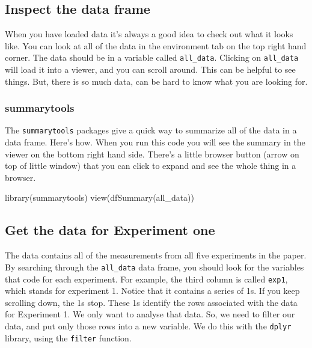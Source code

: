 \documentclass[
]{book}
\newenvironment{Shaded}{\begin{snugshade}}{\end{snugshade}}
\newcommand{\FunctionTok}[1]{\textcolor[rgb]{0.00,0.00,0.00}{#1}}
\newcommand{\NormalTok}[1]{#1}
\begin{document}
\hypertarget{inspect-the-data-frame}{%
\subsection{Inspect the data frame}\label{inspect-the-data-frame}}

When you have loaded data it's always a good idea to check out what it looks like. You can look at all of the data in the environment tab on the top right hand corner. The data should be in a variable called \texttt{all\_data}. Clicking on \texttt{all\_data} will load it into a viewer, and you can scroll around. This can be helpful to see things. But, there is so much data, can be hard to know what you are looking for.

\hypertarget{summarytools-1}{%
\subsubsection{summarytools}\label{summarytools-1}}

The \texttt{summarytools} packages give a quick way to summarize all of the data in a data frame. Here's how. When you run this code you will see the summary in the viewer on the bottom right hand side. There's a little browser button (arrow on top of little window) that you can click to expand and see the whole thing in a browser.

\begin{Shaded}
\begin{Highlighting}[]
\FunctionTok{library}\NormalTok{(summarytools)}
\FunctionTok{view}\NormalTok{(}\FunctionTok{dfSummary}\NormalTok{(all\_data))}
\end{Highlighting}
\end{Shaded}

\hypertarget{get-the-data-for-experiment-one}{%
\subsection{Get the data for Experiment one}\label{get-the-data-for-experiment-one}}

The data contains all of the measurements from all five experiments in the paper. By searching through the \texttt{all\_data} data frame, you should look for the variables that code for each experiment. For example, the third column is called \texttt{exp1}, which stands for experiment 1. Notice that it contains a series of 1s. If you keep scrolling down, the 1s stop. These 1s identify the rows associated with the data for Experiment 1. We only want to analyse that data. So, we need to filter our data, and put only those rows into a new variable. We do this with the \texttt{dplyr} library, using the \texttt{filter} function.
\end{document}
